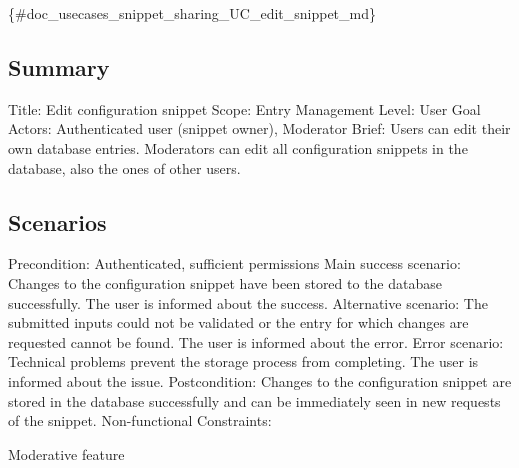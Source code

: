 \{\#doc\+\_\+usecases\+\_\+snippet\+\_\+sharing\+\_\+\+U\+C\+\_\+edit\+\_\+snippet\+\_\+md\}

\subsection*{Summary}

Title\+: Edit configuration snippet Scope\+: Entry Management Level\+: User Goal Actors\+: Authenticated user (snippet owner), Moderator Brief\+: Users can edit their own database entries. Moderators can edit all configuration snippets in the database, also the ones of other users.

\subsection*{Scenarios}

Precondition\+: Authenticated, sufficient permissions Main success scenario\+: Changes to the configuration snippet have been stored to the database successfully. The user is informed about the success. Alternative scenario\+: The submitted inputs could not be validated or the entry for which changes are requested cannot be found. The user is informed about the error. Error scenario\+: Technical problems prevent the storage process from completing. The user is informed about the issue. Postcondition\+: Changes to the configuration snippet are stored in the database successfully and can be immediately seen in new requests of the snippet. Non-\/functional Constraints\+:
\begin{DoxyItemize}
\item Moderative feature 
\end{DoxyItemize}